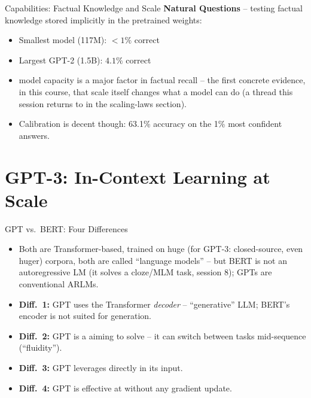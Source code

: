 \begin{vbframe}{Capabilities: Factual Knowledge and Scale}
\textbf{Natural Questions}  -- testing factual knowledge stored implicitly in the pretrained weights:
\begin{itemize}
  \item Smallest model (117M): $<1\%$ correct
  \item Largest GPT-2 (1.5B): $4.1\%$ correct
  \item[$\to$] model capacity is a major factor in factual recall -- the first concrete evidence, in this course, that scale itself changes what a model can do (a thread this session returns to in the scaling-laws section).
  \item Calibration is decent though: 63.1\% accuracy on the 1\% most confident answers.
\end{itemize}
\end{vbframe}


\section{GPT-3: In-Context Learning at Scale}

\begin{vbframe}{GPT vs.\ BERT: Four Differences}
\begin{itemize}
  \item Both are Transformer-based, trained on huge (for GPT-3: closed-source, even huger) corpora, both are called ``language models'' -- but BERT is not an autoregressive LM (it solves a cloze/MLM task, session 8); GPTs are conventional ARLMs.
  \item \textbf{Diff.\ 1:} GPT uses the Transformer \textit{decoder} -- ``generative'' LLM; BERT's encoder is not suited for generation.
  \item \textbf{Diff.\ 2:} GPT is a  aiming to solve  -- it can switch between tasks mid-sequence (``fluidity'').
  \item \textbf{Diff.\ 3:} GPT leverages  directly in its input.
  \item \textbf{Diff.\ 4:} GPT is effective at  without any gradient update.
\end{itemize}
\end{vbframe}

